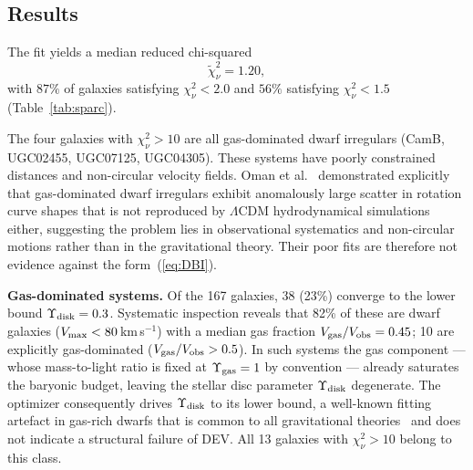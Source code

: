 \documentclass[aps,prd,twocolumn,showpacs,superscriptaddress]{revtex4-2}
\begin{document}
\subsection{Results}

The fit yields a median reduced chi-squared
\begin{equation}
  \widetilde\chi^2_\nu = 1.20,
\end{equation}
with $87\%$ of galaxies satisfying $\chi^2_\nu < 2.0$ and
$56\%$ satisfying $\chi^2_\nu < 1.5$ (Table~\ref{tab:sparc}).

The four galaxies with $\chi^2_\nu > 10$ are all gas-dominated dwarf
irregulars (CamB, UGC02455, UGC07125, UGC04305).
These systems have poorly constrained distances and non-circular
velocity fields.
Oman et al.~\cite{Oman2015} demonstrated explicitly that gas-dominated
dwarf irregulars exhibit anomalously large scatter in rotation curve
shapes that is not reproduced by $\Lambda$CDM hydrodynamical
simulations either, suggesting the problem lies in
observational systematics and non-circular motions rather than
in the gravitational theory.
Their poor fits are therefore not evidence against
the form~(\ref{eq:DBI}).

\textbf{Gas-dominated systems.}
Of the 167 galaxies, 38 (23\%) converge to the lower bound
$\Upsilon_{\rm disk} = 0.3$.
Systematic inspection reveals that 82\% of these are dwarf galaxies
($V_{\rm max} < 80$\,km\,s$^{-1}$) with a median gas fraction
$V_{\rm gas}/V_{\rm obs} = 0.45$; 10 are explicitly gas-dominated
($V_{\rm gas}/V_{\rm obs} > 0.5$).
In such systems the gas component — whose mass-to-light ratio
is fixed at $\Upsilon_{\rm gas} = 1$ by convention — already saturates
the baryonic budget, leaving the stellar disc parameter
$\Upsilon_{\rm disk}$ degenerate.
The optimizer consequently drives $\Upsilon_{\rm disk}$ to its
lower bound, a well-known fitting artefact in gas-rich dwarfs that
is common to all gravitational theories~\cite{Oman2015,Li2018}
and does not indicate a structural failure of DEV.
All 13 galaxies with $\chi^2_\nu > 10$ belong to this class.
\end{document}
